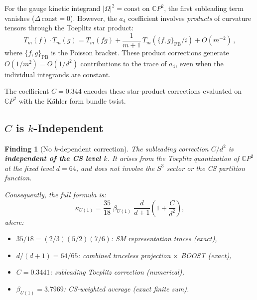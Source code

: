 \documentclass[12pt,a4paper]{article}
\newtheorem{finding}{Finding}
\theoremstyle{definition}
\theoremstyle{remark}
\begin{document}
For the gauge kinetic integrand $|\Omega|^2 = \mathrm{const}$ on
$\mathbb{C}P^2$, the first subleading term vanishes
($\Delta\,\mathrm{const} = 0$).  However, the $a_4$ coefficient involves
\emph{products} of curvature tensors through the Toeplitz star product:
\begin{equation}
T_m(f) \cdot T_m(g) = T_m(fg) + \frac{1}{m+1}\,T_m(\{f,g\}_{\mathrm{PB}}/i)
+ O(m^{-2})\,,
\end{equation}
where $\{f,g\}_{\mathrm{PB}}$ is the Poisson bracket.  These product
corrections generate $O(1/m^2) = O(1/d^2)$ contributions to the trace
of $a_4$, even when the individual integrands are constant.

The coefficient $C = 0.344$ encodes these star-product corrections
evaluated on $\mathbb{C}P^2$ with the K\"ahler form bundle twist.

\subsection{$C$ is $k$-Independent}

\begin{finding}[No $k$-dependent correction]
The subleading correction $C/d^2$ is \textbf{independent of the CS level
$k$}.  It arises from the Toeplitz quantization of $\mathbb{C}P^2$ at the
fixed level $d = 64$, and does not involve the $S^3$ sector or the CS
partition function.

Consequently, the full formula is:
\begin{equation}\label{eq:full-formula}
\kappa_{U(1)} = \frac{35}{18}\;\beta_{U(1)}
\;\frac{d}{d+1}\left(1 + \frac{C}{d^2}\right),
\end{equation}
where:
\begin{itemize}
\item $35/18 = (2/3)(5/2)(7/6)$: SM representation traces (exact),
\item $d/(d+1) = 64/65$: combined traceless projection $\times$ BOOST (exact),
\item $C = 0.3441$: subleading Toeplitz correction (numerical),
\item $\beta_{U(1)} = 3.7969$: CS-weighted average (exact finite sum).
\end{itemize}
\end{finding}

\end{document}
